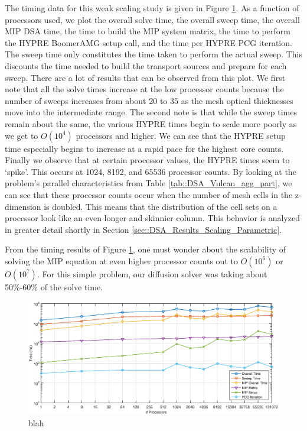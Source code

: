 The timing data for this weak scaling study is given in Figure \ref{fig::DSA_Vulcan_MIP_Timing}. As a function of processors used, we plot the overall solve time, the overall sweep time, the overall MIP DSA time, the time to build the MIP system matrix, the time to perform the HYPRE BoomerAMG setup call, and the time per HYPRE PCG iteration. The sweep time only constitutes the time taken to perform the actual sweep. This discounts the time needed to build the transport sources and prepare for each sweep. There are a lot of results that can be observed from this plot. We first note that all the solve times increase at the low processor counts because the number of sweeps increases from about 20 to 35 as the mesh optical thicknesses move into the intermediate range. The second note is that while the sweep times remain about the same, the various HYPRE times begin to scale more poorly as we get to $O(10^4)$ processors and higher. We can see that the HYPRE setup time especially begins to increase at a rapid pace for the highest core counts. Finally we observe that at certain processor values, the HYPRE times seem to `spike'. This occurs at 1024, 8192, and 65536 processor counts. By looking at the problem's parallel characteristics from Table \ref{tab::DSA_Vulcan_agg_part}, we can see that these processor counts occur when the number of mesh cells in the z-dimension is doubled. This means that the distribution of the cell sets on a processor look like an even longer and skinnier column. This behavior is analyzed in greater detail shortly in Section \ref{sec::DSA_Results_Scaling_Parametric}.

From the timing results of Figure \ref{fig::DSA_Vulcan_MIP_Timing}, one must wonder about the scalability of solving the MIP equation at even higher processor counts out to $O(10^6)$ or $O(10^7)$. For this simple problem, our diffusion solver was taking about 50\%-60\% of the solve time.

\begin{figure}
\centering
\includegraphics[width=\textwidth]{figures/sec_DSA/Vulcan_DSA_Timing.eps}
\caption{blah}
\label{fig::DSA_Vulcan_MIP_Timing}
\end{figure}

